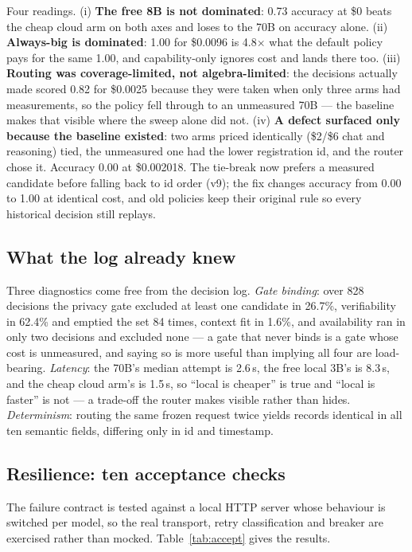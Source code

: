 \documentclass[11pt]{article}
\begin{document}
Four readings. (i) \textbf{The free 8B is not dominated}: 0.73 accuracy at \$0 beats the cheap
cloud arm on both axes and loses to the 70B on accuracy alone. (ii) \textbf{Always-big is
dominated}: 1.00 for \$0.0096 is 4.8$\times$ what the default policy pays for the same 1.00, and
capability-only ignores cost and lands there too. (iii) \textbf{Routing was coverage-limited,
not algebra-limited}: the decisions actually made scored 0.82 for \$0.0025 because they were
taken when only three arms had measurements, so the policy fell through to an unmeasured 70B ---
the baseline makes that visible where the sweep alone did not. (iv) \textbf{A defect surfaced
only because the baseline existed}: two arms priced identically (\$2/\$6 chat and reasoning)
tied, the unmeasured one had the lower registration id, and the router chose it. Accuracy 0.00
at \$0.002018. The tie-break now prefers a measured candidate before falling back to id order
(v9); the fix changes accuracy from 0.00 to 1.00 at identical cost, and old policies keep their
original rule so every historical decision still replays.

\subsection{What the log already knew}

Three diagnostics come free from the decision log. \emph{Gate binding}: over 828 decisions the
privacy gate excluded at least one candidate in 26.7\%, verifiability in 62.4\% and emptied the
set 84 times, context fit in 1.6\%, and availability ran in only two decisions and excluded none
--- a gate that never binds
is a gate whose cost is unmeasured, and saying so is more useful than implying all four are
load-bearing. \emph{Latency}: the 70B's median attempt is 2.6\,s, the free local 3B's is 8.3\,s,
and the cheap cloud arm's is 1.5\,s, so ``local is cheaper'' is true and ``local is faster'' is
not --- a trade-off the router makes visible rather than hides. \emph{Determinism}: routing the
same frozen request twice yields records identical in all ten semantic fields, differing only in
id and timestamp.

\subsection{Resilience: ten acceptance checks}

The failure contract is tested against a local HTTP server whose behaviour is switched per model,
so the real transport, retry classification and breaker are exercised rather than mocked.
Table~\ref{tab:accept} gives the results.
\end{document}
